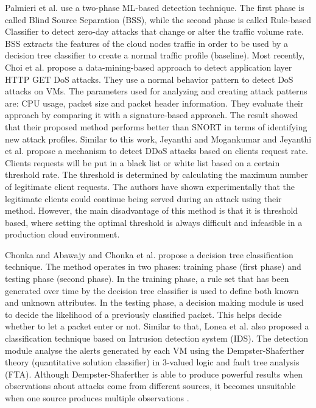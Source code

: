 \documentclass[twocolumn]{bmcart}%
\begin{document}
Palmieri et al. \cite{palmieri2014distributed} use a two-phase ML-based detection technique. The first phase is called Blind Source Separation (BSS), while the second phase is called Rule-based Classifier to detect zero-day attacks that change or alter the traffic volume rate. BSS extracts the features of the cloud nodes traffic in order to be used by a decision tree classifier to create a normal traffic profile (baseline). Most recently, Choi et al. \cite{choi2014method} propose a data-mining-based approach to detect application layer HTTP GET DoS attacks. They use a normal behavior pattern to detect DoS attacks on VMs. The parameters used for analyzing and creating attack patterns are: CPU usage, packet size and packet header information. They evaluate their approach by comparing it with a signature-based approach. The result showed that their proposed method performs better than SNORT in terms of identifying new attack profiles. Similar to this work, Jeyanthi and Mogankumar \cite{jeyanthi2014virtual} and Jeyanthi et al. \cite{jeyanthi2013escape} propose a mechanism to detect DDoS attacks based on clients request rate. Clients requests will be put in a black list or white list based on a certain threshold rate. The threshold is determined by calculating the maximum number of legitimate client requests. The authors have shown experimentally that the legitimate clients could continue being served during an attack using their method. However, the main disadvantage of this method is that it is threshold based, where setting the optimal threshold is always difficult and infeasible in a production cloud environment.


Chonka and Abawajy \cite{chonka2012detecting} and Chonka et al. \cite{chonka2011cloud} propose a decision tree classification technique. The method operates in two phases: training phase (first phase) and testing phase (second phase). In the training phase, a rule set that has been generated over time by the decision tree classifier is used to define both known and unknown attributes. In the testing phase, a decision making module is used to decide the likelihood of a previously classified packet. This helps decide whether to let a packet enter or not. Similar to that, Lonea et al. \cite{lonea2013detecting} also proposed a classification technique based on Intrusion detection system (IDS). The detection module analyse the alerts generated by each VM using the Dempster-Shaferther theory (quantitative solution classifier) in 3-valued logic and fault tree analysis (FTA). Although Dempster-Shaferther is able to produce powerful results when observations about attacks come from different sources, it becomes unsuitable when one source produces multiple observations \cite{wahab2014dempster}.
\end{document}
